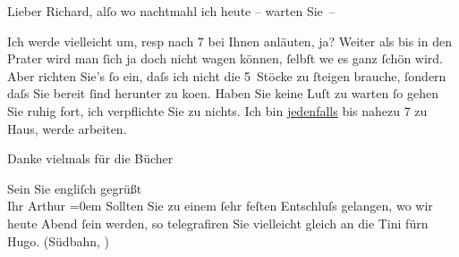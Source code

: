 \pstart{}Lieber Richard,\pend\vspace{0.5em}
\pstart
           alſo wo nachtmahl ich heute – warten Sie –\pend
           
\pstart
           Ich werde vielleicht um, resp nach 7 bei Ihnen anläuten, ja? Weiter als
               bis in den 
               Prater
                wird man{ }ſich ja doch nicht {\pb}wagen können,{ }ſelbſt we{\geminationn}
               es ganz{ }ſchön wird. Aber richten Sie’s{ }ſo ein, daſs ich nicht die 5 Stöcke zu{ }ſteigen
               brauche,{ }ſondern daſs Sie bereit{ }ſind herunter zu ko{\geminationm}en.
               Haben Sie keine Luſt zu warten{ }ſo gehen Sie ruhig fort, ich verpflichte Sie zu {\pb}nichts. Ich bin \uline{jedenfalls} bis nahezu 7 zu Haus, werde arbeiten.\pend
           
\pstart
           Danke vielmals für die Bücher\pend
           
\pstart
           Sein Sie engliſch gegrüßt{\\[\baselineskip]}Ihr \spacefill\mbox{Arthur}\pend
           \leftskip=0em{}
\pstart
           Sollten Sie zu einem{ }ſehr feſten Entschluſs gelangen, wo {\pb}wir heute Abend{ }ſein werden, so telegrafiren Sie
               vielleicht gleich an die Tini fürn Hugo. (Südbahn, \label{K_L00549-2v}\label{K_L00549-2})\pend
           \endnumbering{}  \newcommand{\dateiname}{L00549}\newcommand{\titel}{Arthur Schnitzler an Richard Beer-Hofmann, [21. 3. 1895?]}\newcommand{\editorInnen}{Martin Anton Müller und Gerd-Hermann Susen}
